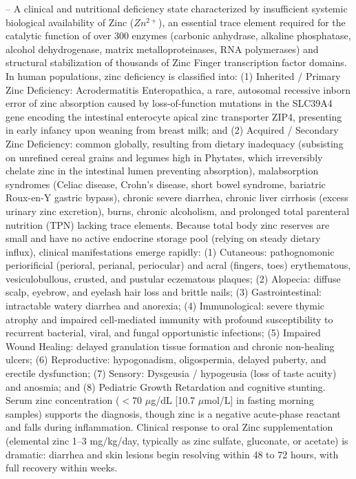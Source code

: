 -- A clinical and nutritional deficiency state characterized by insufficient systemic biological availability of Zinc ($Zn^{2+}$), an essential trace element required for the catalytic function of over 300 enzymes (carbonic anhydrase, alkaline phosphatase, alcohol dehydrogenase, matrix metalloproteinases, RNA polymerases) and structural stabilization of thousands of Zinc Finger transcription factor domains. In human populations, zinc deficiency is classified into: (1) Inherited / Primary Zinc Deficiency: Acrodermatitis Enteropathica, a rare, autosomal recessive inborn error of zinc absorption caused by loss-of-function mutations in the SLC39A4 gene encoding the intestinal enterocyte apical zinc transporter ZIP4, presenting in early infancy upon weaning from breast milk; and (2) Acquired / Secondary Zinc Deficiency: common globally, resulting from dietary inadequacy (subsisting on unrefined cereal grains and legumes high in Phytates, which irreversibly chelate zinc in the intestinal lumen preventing absorption), malabsorption syndromes (Celiac disease, Crohn's disease, short bowel syndrome, bariatric Roux-en-Y gastric bypass), chronic severe diarrhea, chronic liver cirrhosis (excess urinary zinc excretion), burns, chronic alcoholism, and prolonged total parenteral nutrition (TPN) lacking trace elements. Because total body zinc reserves are small and have no active endocrine storage pool (relying on steady dietary influx), clinical manifestations emerge rapidly: (1) Cutaneous: pathognomonic periorificial (perioral, perianal, periocular) and acral (fingers, toes) erythematous, vesiculobullous, crusted, and pustular eczematous plaques; (2) Alopecia: diffuse scalp, eyebrow, and eyelash hair loss and brittle nails; (3) Gastrointestinal: intractable watery diarrhea and anorexia; (4) Immunological: severe thymic atrophy and impaired cell-mediated immunity with profound susceptibility to recurrent bacterial, viral, and fungal opportunistic infections; (5) Impaired Wound Healing: delayed granulation tissue formation and chronic non-healing ulcers; (6) Reproductive: hypogonadism, oligospermia, delayed puberty, and erectile dysfunction; (7) Sensory: Dysgeusia / hypogeusia (loss of taste acuity) and anosmia; and (8) Pediatric Growth Retardation and cognitive stunting. Serum zinc concentration ($<70$ $\mu$g/dL [10.7 $\mu$mol/L] in fasting morning samples) supports the diagnosis, though zinc is a negative acute-phase reactant and falls during inflammation. Clinical response to oral Zinc supplementation (elemental zinc 1--3 mg/kg/day, typically as zinc sulfate, gluconate, or acetate) is dramatic: diarrhea and skin lesions begin resolving within 48 to 72 hours, with full recovery within weeks.
